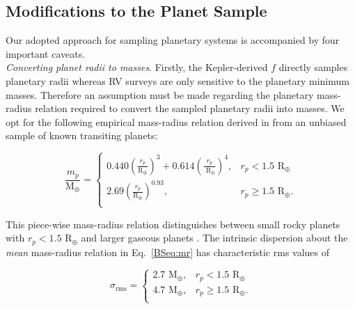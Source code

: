 \subsection{Modifications to the Planet Sample} \label{BSsect:dynam}
Our adopted approach for sampling planetary systems is accompanied by four important caveats. \\

\emph{Converting planet radii to masses}. Firstly, the Kepler-derived $f$ directly samples
planetary radii whereas RV surveys are only sensitive to the planetary minimum
masses. Therefore an assumption must be made regarding the 
planetary mass-radius relation required to convert the sampled planetary radii into masses.
We opt for the following empirical mass-radius relation derived in \cite{weiss14} from an unbiased
sample of known transiting planets:

\begin{equation}
  \frac{m_p}{\text{M}_{\oplus}} =
  \begin{cases}
    0.440 \left( \frac{r_p}{\text{R}_{\oplus}} \right)^3 + 0.614 \left( \frac{r_p}{\text{ R}_{\oplus}} \right)^4, &
    r_p < 1.5 \text{ R}_{\oplus} \\
    2.69 \left( \frac{r_p}{\text{R}_{\oplus}} \right)^{0.93}, & r_p \ge 1.5 \text{ R}_{\oplus}. \\
  \end{cases}
 \label{BSeq:mr}
\end{equation}

\noindent This piece-wise mass-radius relation distinguishes between small rocky planets with
$r_p < 1.5$ R$_{\oplus}$ and larger gaseous planets \citep[e.g.][]{rogers15, dressing15b, fulton17}. The
intrinsic dispersion about the \emph{mean} mass-radius relation in Eq.~\ref{BSeq:mr} has characteristic
rms values of

\begin{equation}
  \sigma_{\text{rms}} =
  \begin{cases}
    2.7 \text{ M}_{\oplus}, & r_p < 1.5 \text{ R}_{\oplus} \\
    4.7 \text{ M}_{\oplus}, & r_p \ge 1.5 \text{ R}_{\oplus}. \\
  \end{cases}
  \label{BSeq:mrscat}
\end{equation}

